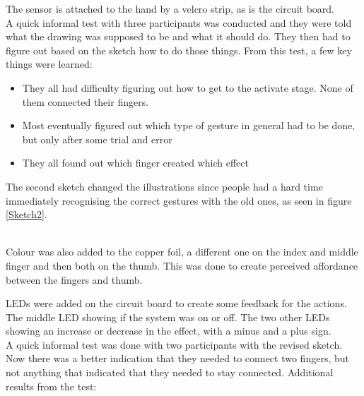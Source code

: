The sensor is attached to the hand by a velcro strip, as is the circuit board. \\

A quick informal test with three participants was conducted and they were told what the drawing was supposed to be and what it should do. They then had to figure out based on the sketch how to do those things.
From this test, a few key things were learned:
 
\begin{itemize}
	\item They all had difficulty figuring out how to get to the activate stage. None of them connected their fingers.
	\item Most eventually figured out which type of gesture in general had to be done, but only after some trial and error
	\item They all found out which finger created which effect
\end{itemize}

The second sketch changed the illustrations since people had a hard time immediately recognising the correct gestures with the old ones, as seen in figure \ref{Sketch2}.\\

\begin{minipage}{\linewidth}%
\label{Sketch2}
\end{minipage}\\

Colour was also added to the copper foil, a different one on the index and middle finger and then both on the thumb. This was done to create perceived affordance between the fingers and thumb.

LEDs were added on the circuit board to create some feedback for the actions. The middle LED showing if the system was on or off. The two other LEDs showing an increase or decrease in the effect, with a minus and a plus sign.\\

A quick informal test was done with two participants with the revised sketch. Now there was a better indication that they needed to connect two fingers, but not anything that indicated that they needed to stay connected.
Additional results from the test:

